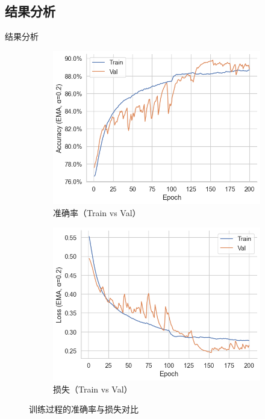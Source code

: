 \documentclass[aspectratio=169]{beamer}
\begin{document}
\subsection{结果分析}
\begin{frame}{结果分析}
\begin{figure}[htb]
  \centering
  \begin{subfigure}{0.48\linewidth}
    \centering
    \includegraphics[width=\linewidth]{images_in_paper/acc_train_val.png}
    \caption{准确率（Train vs Val）}
    \label{fig:acc}
  \end{subfigure}\hfill
  \begin{subfigure}{0.48\linewidth}
    \centering
    \includegraphics[width=\linewidth]{images_in_paper/loss_train_val.png}
    \caption{损失（Train vs Val）}
    \label{fig:loss}
  \end{subfigure}
  \caption{训练过程的准确率与损失对比}
  \label{fig:acc-loss}
\end{figure}
\end{frame}
\end{document}
